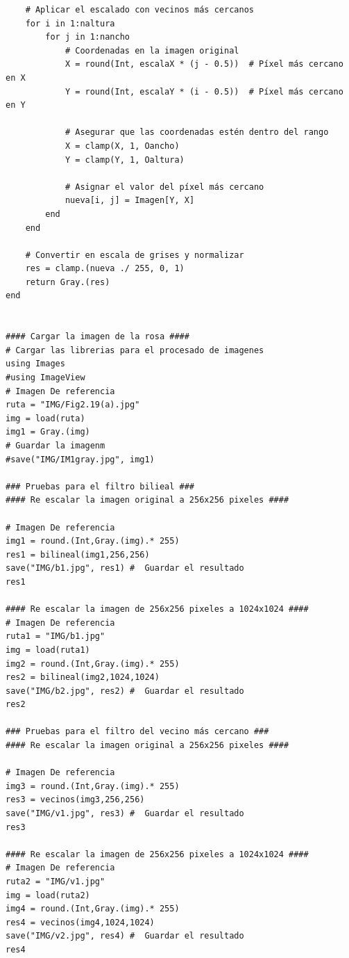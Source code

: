 \documentclass[11pt, letterpaper]{article}
\begin{document}
\begin{itemize}
\begin{verbatim}
	# Aplicar el escalado con vecinos más cercanos
	for i in 1:naltura
		for j in 1:nancho
			# Coordenadas en la imagen original
			X = round(Int, escalaX * (j - 0.5))  # Píxel más cercano en X
			Y = round(Int, escalaY * (i - 0.5))  # Píxel más cercano en Y
		
			# Asegurar que las coordenadas estén dentro del rango
			X = clamp(X, 1, Oancho)
			Y = clamp(Y, 1, Oaltura)
		
			# Asignar el valor del píxel más cercano
			nueva[i, j] = Imagen[Y, X]
		end
	end
		
	# Convertir en escala de grises y normalizar
	res = clamp.(nueva ./ 255, 0, 1)
	return Gray.(res)
end
		

#### Cargar la imagen de la rosa ####
# Cargar las librerias para el procesado de imagenes
using Images
#using ImageView
# Imagen De referencia
ruta = "IMG/Fig2.19(a).jpg"
img = load(ruta)
img1 = Gray.(img)
# Guardar la imagenm
#save("IMG/IM1gray.jpg", img1)
		
### Pruebas para el filtro bilieal ###
#### Re escalar la imagen original a 256x256 pixeles ####
		
# Imagen De referencia
img1 = round.(Int,Gray.(img).* 255)
res1 = bilineal(img1,256,256)
save("IMG/b1.jpg", res1) #  Guardar el resultado
res1
		
#### Re escalar la imagen de 256x256 pixeles a 1024x1024 ####
# Imagen De referencia
ruta1 = "IMG/b1.jpg"
img = load(ruta1)
img2 = round.(Int,Gray.(img).* 255)
res2 = bilineal(img2,1024,1024)
save("IMG/b2.jpg", res2) #  Guardar el resultado
res2
		
### Pruebas para el filtro del vecino más cercano ###
#### Re escalar la imagen original a 256x256 pixeles ####
		
# Imagen De referencia
img3 = round.(Int,Gray.(img).* 255)
res3 = vecinos(img3,256,256)
save("IMG/v1.jpg", res3) #  Guardar el resultado
res3
		
#### Re escalar la imagen de 256x256 pixeles a 1024x1024 ####
# Imagen De referencia
ruta2 = "IMG/v1.jpg"
img = load(ruta2)
img4 = round.(Int,Gray.(img).* 255)
res4 = vecinos(img4,1024,1024)
save("IMG/v2.jpg", res4) #  Guardar el resultado
res4
	\end{verbatim}
\end{itemize}

	
	
	
	
	
	
	
\end{document}
